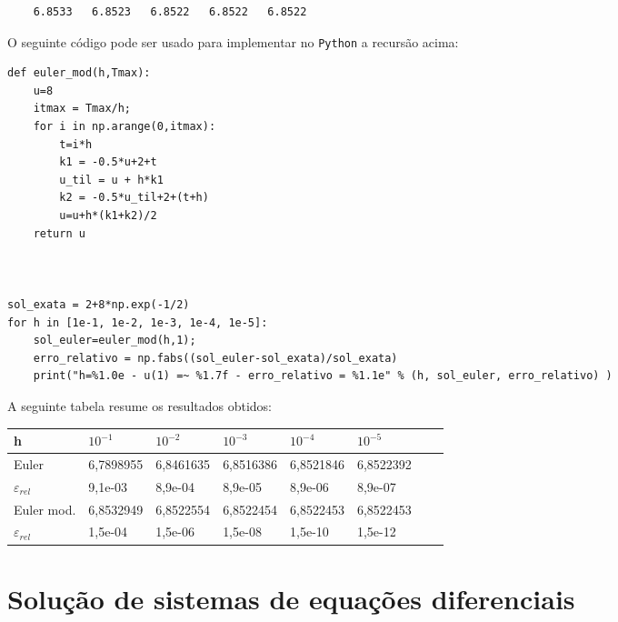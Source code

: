 \begin{resol}
\begin{verbatim}
    6.8533   6.8523   6.8522   6.8522   6.8522
\end{verbatim}
\fi
\ifispython
O seguinte código pode ser usado para implementar no \verb+Python+ a recursão acima:

\begin{verbatim}
def euler_mod(h,Tmax):
	u=8
  	itmax = Tmax/h;
	for i in np.arange(0,itmax):
		t=i*h
		k1 = -0.5*u+2+t
		u_til = u + h*k1
		k2 = -0.5*u_til+2+(t+h)
		u=u+h*(k1+k2)/2
	return u

	

sol_exata = 2+8*np.exp(-1/2)
for h in [1e-1, 1e-2, 1e-3, 1e-4, 1e-5]:
	sol_euler=euler_mod(h,1);
	erro_relativo = np.fabs((sol_euler-sol_exata)/sol_exata)
	print("h=%1.0e - u(1) =~ %1.7f - erro_relativo = %1.1e" % (h, sol_euler, erro_relativo) )

\end{verbatim}
\fi
A seguinte tabela resume os resultados obtidos:
\begin{center}
 \begin{tabular}{|l|l|l|l|l|l|l|l|}%
\hline
   h&$10^{-1}$&$10^{-2}$&$10^{-3}$&$10^{-4}$&$10^{-5}$\\
   \hline
   Euler & 6,7898955 &  6,8461635  &  6,8516386  &  6,8521846  &  6,8522392  \\
   \hline
   $\varepsilon_{rel}$ &9,1e-03 &  8,9e-04  & 8,9e-05&   8,9e-06 &  8,9e-07\\
   \hline
  Euler mod. & 6,8532949 &  6,8522554  &  6,8522454  &  6,8522453  &  6,8522453 \\
   \hline
   $\varepsilon_{rel}$ &1,5e-04 &  1,5e-06  & 1,5e-08&   1,5e-10 &  1,5e-12\\
   \hline
 
   \end{tabular}
\end{center}
\end{resol}

\section{Solução de sistemas de equações diferenciais}\label{pvi:solsistema}

